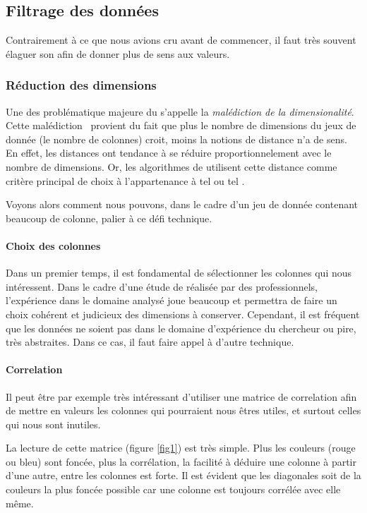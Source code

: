 \subsection{Filtrage des données}
Contrairement à ce que nous avions cru avant de commencer, il faut très souvent élaguer son  afin de donner plus de sens aux valeurs.

\subsubsection{Réduction des dimensions}
Une des problématique majeure du  s'appelle la \emph{malédiction de la dimensionalité}. Cette \og malédiction\fg~ provient du fait que plus le nombre de dimensions du jeux de donnée (\ie le nombre de colonnes) croit, moins la notions de distance n'a de sens. En effet, les distances ont tendance à se réduire proportionnelement avec le nombre de dimensions. Or, les algorithmes de  utilisent cette distance comme critère principal de choix à l'appartenance à tel ou tel .

Voyons alors comment nous pouvons, dans le cadre d'un jeu de donnée contenant beaucoup de colonne, palier à ce défi technique.
\paragraph{Choix des colonnes}
Dans un premier temps, il est fondamental de sélectionner les colonnes qui nous intéressent. Dans le cadre d'une étude de  réalisée par des professionnels, l'expérience dans le domaine analysé joue beaucoup et permettra de faire un choix cohérent et judicieux des dimensions à conserver. Cependant, il est fréquent que les données ne soient pas dans le domaine d'expérience du chercheur ou pire, très abstraites. Dans ce cas, il faut faire appel à d'autre technique.

\paragraph{Correlation}
Il peut être par exemple très intéressant d'utiliser une matrice de correlation afin de mettre en valeurs les colonnes qui pourraient nous êtres utiles, et surtout celles qui nous sont inutiles.

La lecture de cette matrice (figure \ref{fig1}) est très simple. Plus les couleurs (rouge ou bleu) sont foncée, plus la corrélation, \ie la facilité à déduire une colonne à partir d'une autre, entre les colonnes est forte. Il est évident que les diagonales soit de la couleurs la plus foncée possible car une colonne est toujours corrélée avec elle même.

